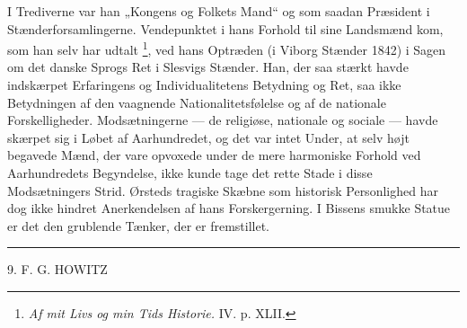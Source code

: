 \documentclass[12pt,a4paper,openany]{book}
\newcommand{\opage}[1]{\marginnote{\footnotesize\textit{[#1]}}}
\begin{document}
I Trediverne var han „Kongens og Folkets Mand“ og som saadan Præsident i
Stænderforsamlingerne. Vendepunktet i hans Forhold til sine Landsmænd kom, som
han selv har udtalt%
\footnote[2]{\textit{Af mit Livs og min Tids Historie.} IV. p. XLII.}, ved hans
Optræden (i Viborg Stænder 1842) i Sagen om det danske Sprogs Ret i Slesvigs
Stænder. Han, der saa stærkt havde indskærpet Erfaringens og Individualitetens
Betydning og Ret, saa ikke Betydningen af den vaagnende Nationalitetsfølelse og
af de nationale Forskelligheder. Modsætningerne --- de religiøse, nationale og
sociale --- havde skærpet sig i Løbet af Aarhundredet, og det var intet Under,
at selv højt begavede Mænd, der vare opvoxede under de mere harmoniske Forhold
ved Aarhundredets Begyndelse, ikke kunde tage det rette Stade i disse
Modsætningers Strid. Ørsteds tragiske Skæbne som historisk Personlighed har dog
ikke hindret Anerkendelsen af hans Forskergerning. I Bissens smukke Statue er
det den grublende Tænker, der er fremstillet.

\begin{center}\rule{2cm}{0.4pt}\end{center}

\setcounter{footnote}{0}%
\opage{81}

\begin{center}\large 9. F. G. HOWITZ\end{center}
\end{document}
